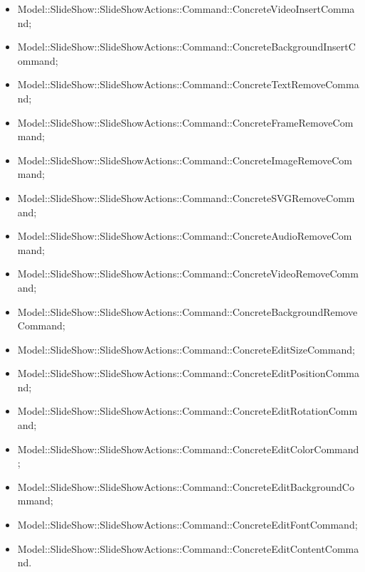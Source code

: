 {{\begin{itemize}
                    \item Model::SlideShow::SlideShowActions::Command::ConcreteVideoInsertCommand;
                    \item Model::SlideShow::SlideShowActions::Command::ConcreteBackgroundInsertCommand;
                    \item Model::SlideShow::SlideShowActions::Command::ConcreteTextRemoveCommand;
                    \item Model::SlideShow::SlideShowActions::Command::ConcreteFrameRemoveCommand;
                    \item Model::SlideShow::SlideShowActions::Command::ConcreteImageRemoveCommand;
                    \item Model::SlideShow::SlideShowActions::Command::ConcreteSVGRemoveCommand;
                    \item Model::SlideShow::SlideShowActions::Command::ConcreteAudioRemoveCommand;
                    \item Model::SlideShow::SlideShowActions::Command::ConcreteVideoRemoveCommand;
                    \item Model::SlideShow::SlideShowActions::Command::ConcreteBackgroundRemoveCommand;
                    \item Model::SlideShow::SlideShowActions::Command::ConcreteEditSizeCommand;
                    \item Model::SlideShow::SlideShowActions::Command::ConcreteEditPositionCommand;
                    \item Model::SlideShow::SlideShowActions::Command::ConcreteEditRotationCommand;
                    \item Model::SlideShow::SlideShowActions::Command::ConcreteEditColorCommand;
                    \item Model::SlideShow::SlideShowActions::Command::ConcreteEditBackgroundCommand;
                    \item Model::SlideShow::SlideShowActions::Command::ConcreteEditFontCommand;
                    \item Model::SlideShow::SlideShowActions::Command::ConcreteEditContentCommand.
                    \end{itemize}
                    }
    }
